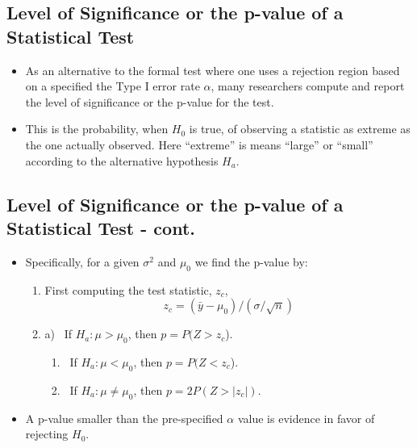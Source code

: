 \documentclass[
  letterpaper,
  DIV=11,
  numbers=noendperiod]{scrartcl}
\providecommand{\tightlist}{%
  \setlength{\itemsep}{0pt}\setlength{\parskip}{0pt}}\usepackage{longtable,booktabs,array}
\begin{document}
\subsection{Level of Significance or the p-value of a Statistical
Test}\label{level-of-significance-or-the-p-value-of-a-statistical-test}

\begin{itemize}
\item
  As an alternative to the formal test where one uses a rejection region
  based on a specified the Type I error rate \(\alpha\), many
  researchers compute and report the {level of significance} or the
  {p-value} for the test.
\item
  This is the probability, when \(H_0\) is true, of observing a
  statistic as extreme as the one actually observed. Here ``extreme'' is
  means ``large'' or ``small'' according to the alternative hypothesis
  \(H_a\).
\end{itemize}

\subsection{Level of Significance or the p-value of a Statistical Test -
cont.}\label{level-of-significance-or-the-p-value-of-a-statistical-test---cont.}

\begin{itemize}
\item
  Specifically, for a given \(\sigma^2\) and \(\mu_0\) we find the
  p-value by:

  \begin{enumerate}
  \def\labelenumi{\arabic{enumi}.}
  \item
    First computing the test statistic, \(z_c\),
    \[z_c = (\bar{y} - \mu_0)/(\sigma/\sqrt{n})\]
  \item
    a) ~If \(H_a: \mu > \mu_0\), then \(p = P(Z > z_c\)).\\

    \begin{enumerate}
    \def\labelenumii{\alph{enumii})}
    \setcounter{enumii}{1}
    \tightlist
    \item
      ~If \(H_a: \mu < \mu_0\), then \(p = P(Z < z_c\)).\\
    \item
      ~If \(H_a: \mu \neq \mu_0\), then \(p=2P(Z > |z_c|)\).
    \end{enumerate}
  \end{enumerate}
\item
  A p-value smaller than the pre-specified \(\alpha\) value is evidence
  in favor of rejecting \(H_0\).
\end{itemize}
\end{document}
